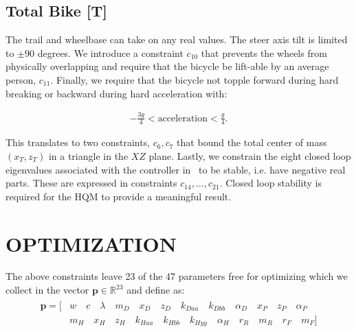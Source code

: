 \documentclass{bmd2019p}
\begin{document}
\subsection{Total Bike [T]}
%
The trail and wheelbase can take on any real values. The steer axis tilt is
limited to $\pm90$ degrees. We introduce a constraint $c_{10}$ that prevents
the wheels from physically overlapping and require that the bicycle be
lift-able by an average person, $c_{11}$. Finally, we require that the bicycle
not topple forward during hard breaking or backward during hard acceleration
with:

\begin{align}
  -\frac{3g}{4} < \textrm{acceleration} < \frac{g}{4}\textrm{.}
\end{align}

This translates to two constraints, $c_6,c_7$ that bound the total center of
mass $(x_T,z_T)$ in a triangle in the $XZ$ plane. Lastly, we constrain the
eight closed loop eigenvalues associated with the controller in~\cite{Hess2012}
to be stable, i.e. have negative real parts. These are expressed in
constraints $c_{14},\ldots,c_{21}$. Closed loop stability is required for the
HQM to provide a meaningful result.

\section{OPTIMIZATION}
%
The above constraints leave 23 of the 47 parameters free for optimizing which
we collect in the vector $\mathbf{p}\in\mathbb{R}^{23}$ and define as:
%
\begin{align}
  \begin{split}
    \mathbf{p} = [ &
       w        \quad
       c        \quad
       \lambda  \quad
       m_D      \quad
       x_D      \quad
       z_D      \quad
       k_{Daa}  \quad
       k_{Dbb}  \quad
       \alpha_D \quad
       x_P      \quad
       z_P      \quad
       \alpha_P \\
     & m_H      \quad
       x_H      \quad
       z_H      \quad
       k_{Haa}  \quad
       k_{Hbb}  \quad
       k_{Hyy}  \quad
       \alpha_H \quad
       r_R      \quad
       m_R      \quad
       r_F      \quad
       m_F]
  \end{split}
\end{align}
\end{document}
